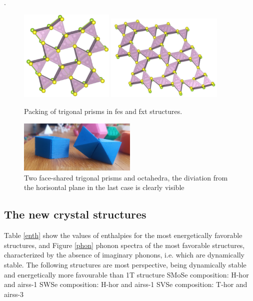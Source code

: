 .\documentclass[a4paperm]{article}
\begin{document}
\begin{figure}[H] \centering
	\includegraphics[width=0.4\textwidth]{fes_SMoSe.jpg}
        \includegraphics[width=0.5\textwidth]{fxt_SMoSe.jpg}
	\caption{Packing of trigonal prisms in fes and fxt structures.}
\label{fes_fxt}
\end{figure}

\begin{figure}[H] \centering
	\includegraphics[width=0.5\textwidth]{2prism_oct.jpg}
	\caption{Two face-shared trigonal prisms and octahedra, the diviation from the horisontal plane in the last case is clearly visible}
\label{2prism_oct.jpg}
\end{figure}


		\subsection{The new crystal structures}

Table \ref{enth} show the values of enthalpies for the most energetically favorable structures, and Figure \ref{phon}  phonon spectra of the most favorable structures, characterized by the absence of imaginary phonons, i.e. which are dynamically stable. The following structures are most perspective, being dynamically stable and energetically more favourable than 1T structure
SMoSe composition: H-hor and airss-1
SWSe composition: H-hor and airss-1
SVSe composition: T-hor and airss-3
\end{document}
